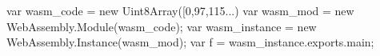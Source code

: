 var wasm_code = new Uint8Array([0,97,115...)
var wasm_mod = new WebAssembly.Module(wasm_code);
var wasm_instance = new WebAssembly.Instance(wasm_mod);
var f = wasm_instance.exports.main;